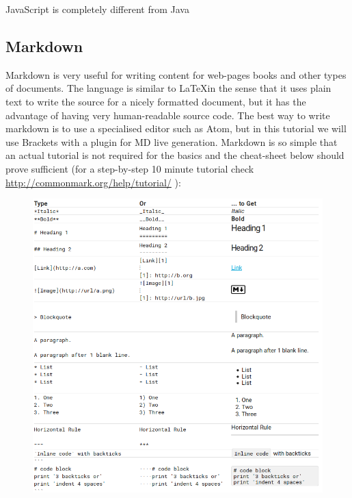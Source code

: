 \documentclass[a4paper]{article}
\begin{document}
\small{JavaScript is completely different from Java}
\subsection{Markdown}
Markdown is very useful for writing content for web-pages books and other types of documents. The language is similar to \LaTeX in the sense that it uses plain text to write the source for a nicely formatted document, but it has the advantage of having very human-readable source code. The best way to write markdown is to use a specialised editor such as Atom, but in this tutorial we will use Brackets with a plugin for MD live generation. Markdown is so simple that an actual tutorial is not required for the basics and the cheat-sheet below should prove sufficient (for a step-by-step 10 minute tutorial check \url{http://commonmark.org/help/tutorial/} ):
\begin{figure}[!HT]
\centering
\includegraphics[scale=0.6]{MD-Tutorial.png}
\end{figure}
\end{document}

